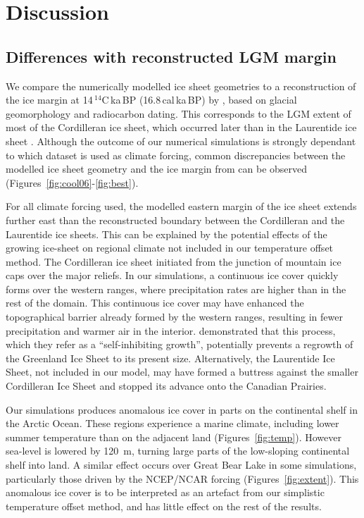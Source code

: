 \section{Discussion}
\label{sec:discussion}

\subsection{Differences with reconstructed LGM margin}

We compare the numerically modelled ice sheet geometries to a reconstruction of the ice margin at 14\,$^{14}$C\,ka\,BP (16.8\,cal\,ka\,BP) by \citet{dyke-2004}, based on glacial geomorphology and radiocarbon dating. This corresponds to the LGM extent of most of the Cordilleran ice sheet, which occurred later than in the Laurentide ice sheet \citep{dyke-2004}.
Although the outcome of our numerical simulations is strongly dependant to which dataset is used as climate forcing, common discrepancies between the modelled ice sheet geometry and the ice margin from \citet{dyke-2004} can be observed (Figures~\ref{fig:cool06}-\ref{fig:best}).

For all climate forcing used, the modelled eastern margin of the ice sheet extends further east than the reconstructed boundary between the Cordilleran and the Laurentide ice sheets. This can be explained by the potential effects of the growing ice-sheet on regional climate not included in our temperature offset method. The Cordilleran ice sheet initiated from the junction of mountain ice caps over the major reliefs. In our simulations, a continuous ice cover quickly forms over the western ranges, where precipitation rates are higher than in the rest of the domain. This continuous ice cover may have enhanced the topographical barrier already formed by the western ranges, resulting in fewer precipitation and warmer air in the interior. \citet{langen-etal-2012} demonstrated that this process, which they refer as a ``self-inhibiting growth'', potentially prevents a regrowth of the Greenland Ice Sheet to its present size. Alternatively, the Laurentide Ice Sheet, not included in our model, may have formed a buttress against the smaller Cordilleran Ice Sheet and stopped its advance onto the Canadian Prairies.

Our simulations produces anomalous ice cover in parts on the continental shelf in the Arctic Ocean. These regions experience a marine climate, including lower summer temperature than on the adjacent land (Figures~\ref{fig:temp}). However sea-level is lowered by 120~m, turning large parts of the low-sloping continental shelf into land. A similar effect occurs over Great Bear Lake in some simulations, particularly those driven by the NCEP/NCAR forcing (Figures~\ref{fig:extent}). This anomalous ice cover is to be interpreted as an artefact from our simplistic temperature offset method, and has little effect on the rest of the results.

